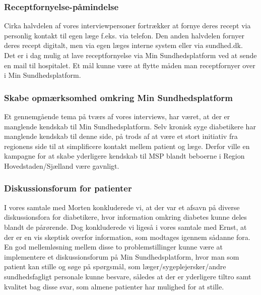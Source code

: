 \subsubsection{Receptfornyelse-påmindelse}
Cirka halvdelen af vores interviewpersoner fortrækker at fornye deres recept via personlig kontakt til egen læge f.eks. via telefon. Den anden halvdelen fornyer deres recept digitalt, men via egen læges interne system eller via sundhed.dk. \\
Det er i dag mulig at lave receptfornyelse via Min Sundhedsplatform ved at sende en mail til hospitalet. Et mål kunne være at flytte måden man receptfornyer over i Min Sundhedsplatform.

\subsubsection{Skabe opmærksomhed omkring Min Sundhedsplatform}
Et gennemgående tema på tværs af vores interviews, har været, at der er manglende kendskab til Min Sundhedsplatform. Selv kronisk syge diabetikere har manglende kendskab til denne side, på trods af at være et stort initiativ fra regionens side til at simplificere kontakt mellem patient og læge. Derfor ville en kampagne for at skabe yderligere kendskab til MSP blandt beboerne i Region Hovedstaden/Sjælland være gavnligt.

\subsubsection{Diskussionsforum for patienter}
I vores samtale med Morten konkluderede vi, at der var et afsavn på diverse diskussionsfora for diabetikere, hvor information omkring diabetes kunne deles blandt de pårørende.
Dog konkluderede vi ligeså i vores samtale med Ernst, at der er en vis skeptisk overfor information, som modtages igennem sådanne fora. En god mellemløsning mellem disse to problemstillinger kunne være at implementere et diskussionsforum på Min Sundhedsplatform, hvor man som patient kan stille og søge på spørgsmål, som læger/sygeplejersker/andre sundhedsfagligt personale kunne besvare, således at der er yderligere tiltro samt kvalitet bag disse svar, som almene patienter har mulighed for at stille. 
